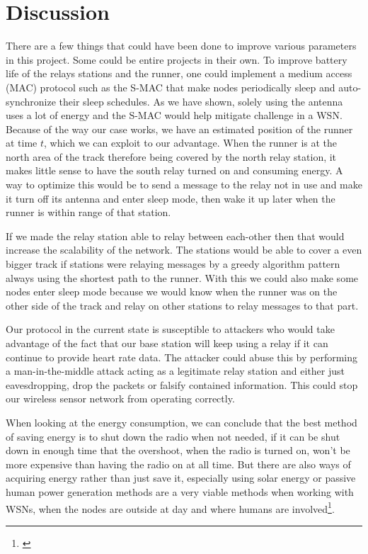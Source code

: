 \section{Discussion}

There are a few things that could have been done to improve various parameters in this project. Some could be entire projects in their own. To improve battery life of the relays stations and the runner, one could implement a medium access (MAC) protocol such as the S-MAC that make nodes periodically sleep and auto-synchronize their sleep schedules. As we have shown, solely using the antenna uses a lot of energy and the S-MAC would help mitigate challenge in a WSN. Because of the way our case works, we have an estimated position of the runner at time $t$, which we can exploit to our advantage. When the runner is at the north area of the track therefore being covered by the north relay station, it makes little sense to have the south relay turned on and consuming energy. A way to optimize this would be to send a message to the relay not in use and make it turn off its antenna and enter sleep mode, then wake it up later when the runner is within range of that station.

\noindent If we made the relay station able to relay between each-other then that would increase the scalability of the network. The stations would be able to cover a even bigger track if stations were relaying messages by a greedy algorithm pattern always using the shortest path to the runner. With this we could also make some nodes enter sleep mode because we would know when the runner was on the other side of the track and relay on other stations to relay messages to that part.

\noindent Our protocol in the current state is susceptible to attackers who would take advantage of the fact that our base station will keep using a relay if it can continue to provide heart rate data. The attacker could abuse this by performing a man-in-the-middle attack acting as a legitimate relay station and either just eavesdropping, drop the packets or falsify contained information. This could stop our wireless sensor network from operating correctly.

\noindent When looking at the energy consumption, we can conclude that the best method of saving energy is to shut down the radio when not needed, if it can be shut down in enough time that the overshoot, when the radio is turned on, won't be more expensive than having the radio on at all time. But there are also ways of acquiring energy rather than just save it, especially using solar energy or passive human power generation methods are a very viable methods when working with WSNs, when the nodes are outside at day and where humans are involved\footnote{\cite{Sudevalayam2011}}.
